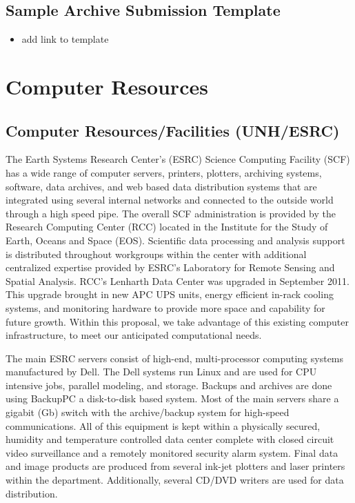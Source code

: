 \documentclass[
  letterpaper,
  DIV=11,
  numbers=noendperiod]{scrreprt}
\providecommand{\tightlist}{%
  \setlength{\itemsep}{0pt}\setlength{\parskip}{0pt}}\usepackage{longtable,booktabs,array}
\begin{document}
\section{Sample Archive Submission
Template}\label{sample-archive-submission-template}

\begin{itemize}
\tightlist
\item
  add link to template
\end{itemize}


\chapter{Computer Resources}\label{computer-resources}

\section{Computer Resources/Facilities
(UNH/ESRC)}\label{computer-resourcesfacilities-unhesrc}

The Earth Systems Research Center's (ESRC) Science Computing Facility
(SCF) has a wide range of computer servers, printers, plotters,
archiving systems, software, data archives, and web based data
distribution systems that are integrated using several internal networks
and connected to the outside world through a high speed pipe. The
overall SCF administration is provided by the Research Computing Center
(RCC) located in the Institute for the Study of Earth, Oceans and Space
(EOS). Scientific data processing and analysis support is distributed
throughout workgroups within the center with additional centralized
expertise provided by ESRC's Laboratory for Remote Sensing and Spatial
Analysis. RCC's Lenharth Data Center was upgraded in September 2011.
This upgrade brought in new APC UPS units, energy efficient in-rack
cooling systems, and monitoring hardware to provide more space and
capability for future growth. Within this proposal, we take advantage of
this existing computer infrastructure, to meet our anticipated
computational needs.

The main ESRC servers consist of high-end, multi-processor computing
systems manufactured by Dell. The Dell systems run Linux and are used
for CPU intensive jobs, parallel modeling, and storage. Backups and
archives are done using BackupPC a disk-to-disk based system. Most of
the main servers share a gigabit (Gb) switch with the archive/backup
system for high-speed communications. All of this equipment is kept
within a physically secured, humidity and temperature controlled data
center complete with closed circuit video surveillance and a remotely
monitored security alarm system. Final data and image products are
produced from several ink-jet plotters and laser printers within the
department. Additionally, several CD/DVD writers are used for data
distribution.
\end{document}
